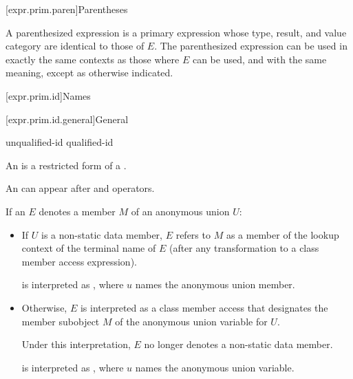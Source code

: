 [expr.prim.paren]{Parentheses}

\pnum
{}%
A parenthesized expression 
is a primary expression whose type, result, and value category are identical to those of $E$.
The parenthesized expression can be used in exactly the same contexts as
those where $E$ can be used, and with the same
meaning, except as otherwise indicated.

[expr.prim.id]{Names}

[expr.prim.id.general]{General}

\begin{bnf}
\br
    unqualified-id\br
    qualified-id
\end{bnf}

\pnum
{}%
%
An  is a restricted form of a
.
\begin{note}
An  can appear after  and \tcode{->}
operators.
\end{note}

\pnum
If an  $E$ denotes
a member $M$ of an anonymous union $U$:
\begin{itemize}
\item
If $U$ is a non-static data member,
$E$ refers to $M$ as a member of the lookup context of the terminal name of $E$ (after any transformation to
a class member access expression).
\begin{example}
 is interpreted as ,
where $u$ names the anonymous union member.
\end{example}
\item
Otherwise, $E$ is interpreted as a class member access
that designates the member subobject $M$ of
the anonymous union variable for $U$.
\begin{note}
Under this interpretation, $E$ no longer denotes a non-static data member.
\end{note}
\begin{example}
 is interpreted as ,
where $u$ names the anonymous union variable.
\end{example}
\end{itemize}

